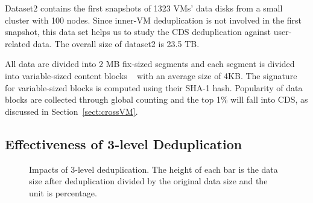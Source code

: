 Dataset2 contains the first snapshots of 1323 VMs' data disks from a small cluster with 100 nodes. 
Since inner-VM deduplication is not involved in the first snapshot, this data set helps us to 
study the CDS deduplication against user-related data. The overall size of dataset2 is 23.5 TB.

All data are divided into 2 MB fix-sized segments and each segment is divided into 
variable-sized content blocks ~\cite{similar94,rabin81} with an average size of 4KB.
The signature for variable-sized blocks is computed using their SHA-1 hash. 
Popularity of data blocks are collected through global counting 
and the top 1\% will fall into CDS, as discussed in Section~\ref{sect:crossVM}.




\subsection{Effectiveness of 3-level Deduplication}

\begin{figure}
  \centering
  \caption{Impacts of 3-level deduplication. The height of each bar is the data size after 
deduplication divided by the original data size and the unit is percentage. }

  \label{fig:overall}
\end{figure}

